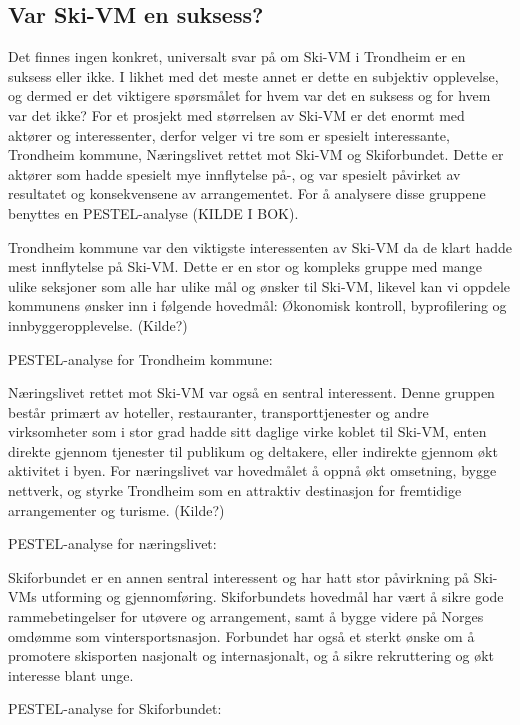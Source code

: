 \subsection{Var Ski-VM en suksess?}
Det finnes ingen konkret, universalt svar på om Ski-VM i Trondheim er en suksess eller ikke.  I likhet med det meste annet er dette en subjektiv opplevelse, og dermed er det viktigere spørsmålet for hvem var det en suksess og for hvem var det ikke? For et prosjekt med størrelsen av Ski-VM er det enormt med aktører og interessenter, derfor velger vi tre som er spesielt interessante, Trondheim kommune, Næringslivet rettet mot Ski-VM og Skiforbundet. Dette er aktører som hadde spesielt mye innflytelse på-, og var spesielt påvirket av resultatet og konsekvensene av arrangementet. For å analysere disse gruppene benyttes en PESTEL-analyse (KILDE I BOK).

Trondheim kommune var den viktigste interessenten av Ski-VM da de klart hadde mest innflytelse på Ski-VM. Dette er en stor og kompleks gruppe med mange ulike seksjoner som alle har ulike mål og ønsker til Ski-VM, likevel kan vi oppdele kommunens ønsker inn i følgende hovedmål: Økonomisk kontroll, byprofilering og innbyggeropplevelse. (Kilde?)

PESTEL-analyse for Trondheim kommune:

Næringslivet rettet mot Ski-VM var også en sentral interessent. Denne gruppen består primært av hoteller, restauranter, transporttjenester og andre virksomheter som i stor grad hadde sitt daglige virke koblet til Ski-VM, enten direkte gjennom tjenester til publikum og deltakere, eller indirekte gjennom økt aktivitet i byen. For næringslivet var hovedmålet å oppnå økt omsetning, bygge nettverk, og styrke Trondheim som en attraktiv destinasjon for fremtidige arrangementer og turisme. (Kilde?)

PESTEL-analyse for næringslivet:


Skiforbundet er en annen sentral interessent og har hatt stor påvirkning på Ski-VMs utforming og gjennomføring. Skiforbundets hovedmål har vært å sikre gode rammebetingelser for utøvere og arrangement, samt å bygge videre på Norges omdømme som vintersportsnasjon. Forbundet har også et sterkt ønske om å promotere skisporten nasjonalt og internasjonalt, og å sikre rekruttering og økt interesse blant unge.

PESTEL-analyse for Skiforbundet:
